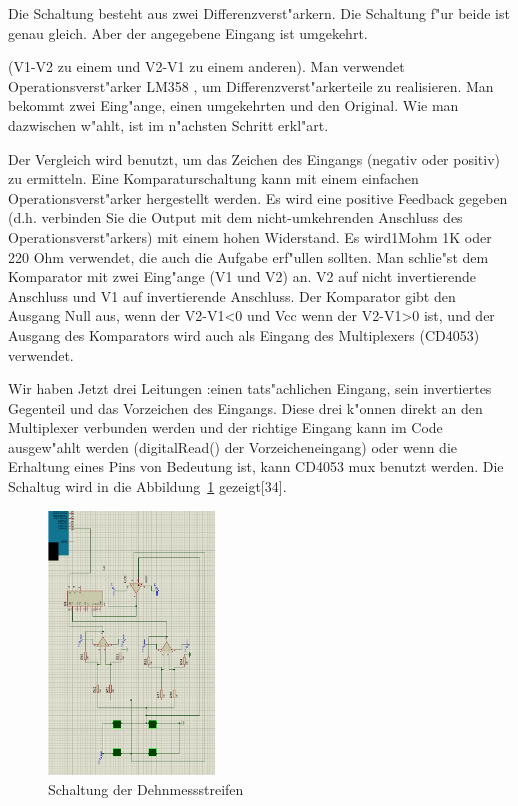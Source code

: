 Die Schaltung besteht aus zwei Differenzverst"arkern. 
Die Schaltung f"ur beide ist genau gleich. 
Aber der angegebene Eingang ist umgekehrt.

(V1-V2 zu einem und V2-V1 zu einem anderen). Man verwendet Operationsverst"arker LM358 ,
 um Differenzverst"arkerteile zu realisieren. 
 Man bekommt zwei Eing"ange, einen umgekehrten und den Original. 
 Wie man dazwischen  w"ahlt, ist im n"achsten Schritt erkl"art. 

Der Vergleich wird benutzt, um das Zeichen des Eingangs 
(negativ oder positiv) zu ermitteln. Eine Komparaturschaltung 
kann mit einem einfachen Operationsverst"arker hergestellt werden. 
Es wird eine positive Feedback gegeben 
(d.h. verbinden Sie die Output mit dem nicht-umkehrenden Anschluss des Operationsverst"arkers) 
mit einem hohen Widerstand. Es wird1Mohm 1K oder 220 Ohm verwendet, 
die auch die Aufgabe erf"ullen sollten. Man schlie"st dem Komparator mit  
zwei Eing"ange (V1 und V2) an. V2 auf nicht invertierende Anschluss und 
V1 auf invertierende Anschluss. Der Komparator gibt den Ausgang Null aus, 
wenn der V2-V1<0 und Vcc wenn der V2-V1>0 ist, und der Ausgang des Komparators wird auch 
als Eingang des Multiplexers (CD4053) verwendet.

Wir haben Jetzt  drei Leitungen :einen tats"achlichen Eingang, 
sein invertiertes Gegenteil und das Vorzeichen des Eingangs. 
Diese drei k"onnen direkt an den Multiplexer verbunden werden und der 
richtige Eingang kann im Code ausgew"ahlt werden (digitalRead() der Vorzeicheneingang) 
oder wenn die Erhaltung eines Pins von Bedeutung ist, 
kann CD4053 mux benutzt werden. Die Schaltug wird in 
die Abbildung~\ref{fig:Dehn}  gezeigt[34].

\begin{figure}[!htb]
\begin{center}
\includegraphics[height=7cm]{bilder/Dehn.eps}
\end{center}
\caption{Schaltung der Dehnmessstreifen}\label{fig:Dehn}
\end{figure}








